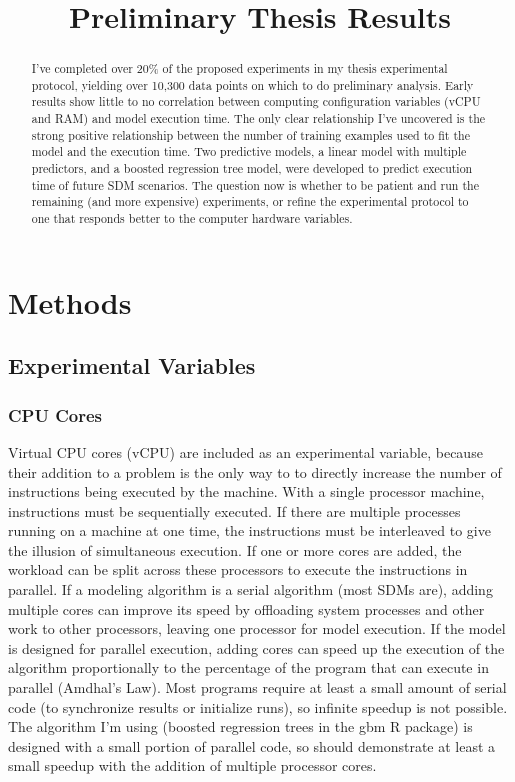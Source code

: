 \documentclass[a4paper]{article}
\title{Preliminary Thesis Results}
\begin{document}
\maketitle

\begin{abstract}
I've completed over 20\% of the proposed experiments in my thesis experimental protocol, yielding over 10,300 data points on which to do preliminary analysis. Early results show little to no correlation between computing configuration variables (vCPU and RAM) and model execution time.   The only clear relationship I've uncovered is the strong positive relationship between the number of training examples used to fit the model and the execution time.  Two predictive models, a linear model with multiple predictors, and a boosted regression tree model, were developed to predict execution time of future SDM scenarios.  The question now is whether to be patient and run the remaining (and more expensive) experiments, or refine the experimental protocol to one that responds better to the computer hardware variables.
\end{abstract}

\section{Methods}

\subsection{Experimental Variables}
\subsubsection{CPU Cores}
Virtual CPU cores (vCPU) are included as an experimental variable, because their addition to a problem is the only way to to directly increase the number of instructions being executed by the machine.  With a single processor machine, instructions must be sequentially executed.  If there are multiple processes running on a machine at one time, the instructions must be interleaved to give the illusion of simultaneous execution.  If one or more cores are added, the workload can be split across these processors to execute the instructions in parallel.  If a modeling algorithm is a serial algorithm (most SDMs are), adding multiple cores can improve its speed by offloading system processes and other work to other processors, leaving one processor for model execution.  If the model is designed for parallel execution, adding cores can speed up the execution of the algorithm proportionally to the percentage of the program that can execute in parallel (Amdhal's Law).  Most programs require at least a small amount of serial code (to synchronize results or initialize runs), so infinite speedup is not possible.  The algorithm I'm using (boosted regression trees in the gbm R package) is designed with a small portion of parallel code, so should demonstrate at least a small speedup  with the addition of multiple processor cores.
\end{document}
